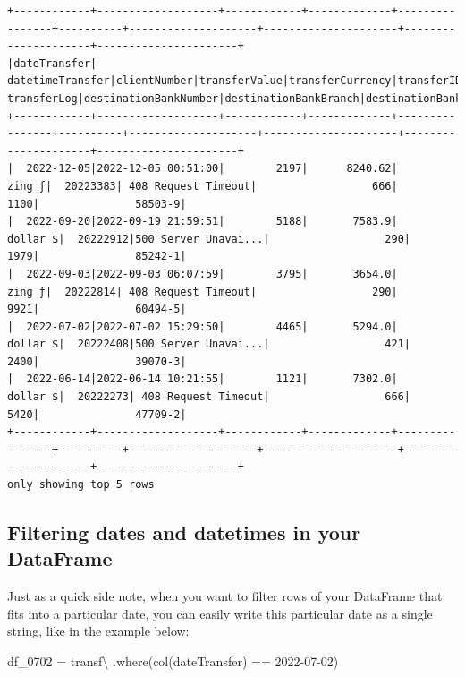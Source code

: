 \documentclass[
  11pt,
  letterpaper,
  DIV=11,
  numbers=noendperiod]{scrreprt}
\newenvironment{Shaded}{\begin{snugshade}}{\end{snugshade}}
\newcommand{\NormalTok}[1]{\textcolor[rgb]{0.00,0.23,0.31}{#1}}
\newcommand{\OperatorTok}[1]{\textcolor[rgb]{0.37,0.37,0.37}{#1}}
\newcommand{\StringTok}[1]{\textcolor[rgb]{0.13,0.47,0.30}{#1}}
\begin{document}
\begin{verbatim}
+------------+-------------------+------------+-------------+----------------+----------+--------------------+---------------------+---------------------+----------------------+
|dateTransfer|   datetimeTransfer|clientNumber|transferValue|transferCurrency|transferID|         transferLog|destinationBankNumber|destinationBankBranch|destinationBankAccount|
+------------+-------------------+------------+-------------+----------------+----------+--------------------+---------------------+---------------------+----------------------+
|  2022-12-05|2022-12-05 00:51:00|        2197|      8240.62|          zing ƒ|  20223383| 408 Request Timeout|                  666|                 1100|               58503-9|
|  2022-09-20|2022-09-19 21:59:51|        5188|       7583.9|        dollar $|  20222912|500 Server Unavai...|                  290|                 1979|               85242-1|
|  2022-09-03|2022-09-03 06:07:59|        3795|       3654.0|          zing ƒ|  20222814| 408 Request Timeout|                  290|                 9921|               60494-5|
|  2022-07-02|2022-07-02 15:29:50|        4465|       5294.0|        dollar $|  20222408|500 Server Unavai...|                  421|                 2400|               39070-3|
|  2022-06-14|2022-06-14 10:21:55|        1121|       7302.0|        dollar $|  20222273| 408 Request Timeout|                  666|                 5420|               47709-2|
+------------+-------------------+------------+-------------+----------------+----------+--------------------+---------------------+---------------------+----------------------+
only showing top 5 rows
\end{verbatim}

\hypertarget{filtering-dates-and-datetimes-in-your-dataframe}{%
\subsection{Filtering dates and datetimes in your
DataFrame}\label{filtering-dates-and-datetimes-in-your-dataframe}}

Just as a quick side note, when you want to filter rows of your
DataFrame that fits into a particular date, you can easily write this
particular date as a single string, like in the example below:

\begin{Shaded}
\begin{Highlighting}[]
\NormalTok{df\_0702 }\OperatorTok{=}\NormalTok{ transf}\OperatorTok{\textbackslash{}}
\NormalTok{  .where(col(}\StringTok{\textquotesingle{}dateTransfer\textquotesingle{}}\NormalTok{) }\OperatorTok{==} \StringTok{\textquotesingle{}2022{-}07{-}02\textquotesingle{}}\NormalTok{)}
\end{Highlighting}
\end{Shaded}
\end{document}

